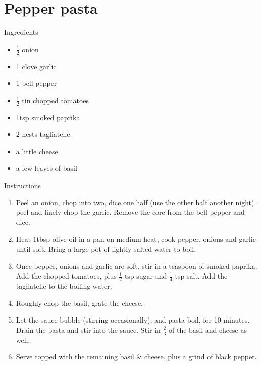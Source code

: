 \documentclass[../dinner.tex]{subfiles}
\begin{document}
	\pagestyle{fancy}
	\fancyhf{}
	\newpage
	\section{Pepper pasta}
	\lhead{}
	{\Large Ingredients}
	\begin{multicols}{2}
		\begin{itemize}
			\item \(\frac{1}{2}\) onion
			\item 1 clove garlic
			\item 1 bell pepper
			\item \(\frac{1}{2}\) tin chopped tomatoes
		\end{itemize}
		\columnbreak
		\begin{itemize}
			\item 1tsp smoked paprika
			\item 2 nests tagliatelle
			\item a little cheese
			\item a few leaves of basil
		\end{itemize}
	\end{multicols}

	{\Large Instructions}
	\begin{enumerate}
		\item Peel an onion, chop into two, dice one half (use the other half another night). peel and finely chop the garlic. Remove the core from the bell pepper and dice.
		\item Heat 1tbsp olive oil in a pan on medium heat, cook pepper, onions and garlic until soft. Bring a large pot of lightly salted water to boil.
		\item Once pepper, onions and garlic are soft, stir in a teaspoon of smoked paprika. Add the chopped tomatoes, plus \(\frac{1}{2}\) tsp sugar and \(\frac{1}{4}\) tsp salt. Add the tagliatelle to the boiling water.
		\item Roughly chop the basil, grate the cheese.
		\item Let the sauce bubble (stirring occasionally), and pasta boil, for 10 minutes. Drain the pasta and stir into the sauce. Stir in \(\frac{2}{3}\) of the basil and cheese as well. 
		\item Serve topped with the remaining basil \& cheese, plus a grind of black pepper.
	\end{enumerate}
\end{document}
